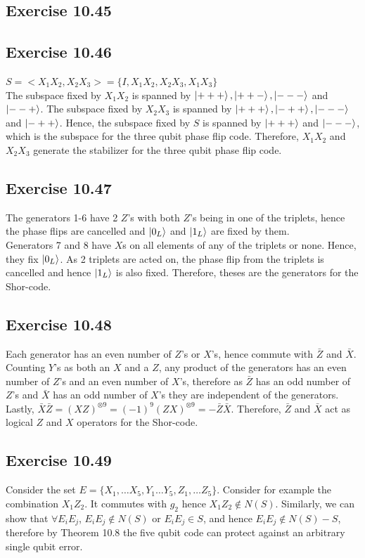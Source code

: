\documentclass[a4paper,12pt]{article}
\begin{document}
\subsection*{Exercise 10.45}

\subsection*{Exercise 10.46}
$S=<X_1X_2,X_2X_3>=\{I,X_1X_2,X_2X_3,X_1X_3\}$\\
The subspace fixed by $X_1X_2$ is spanned by $\ket{+++},\ket{++-},\ket{---}$ and $\ket{--+}$.
The subspace fixed by $X_2X_3$ is spanned by $\ket{+++},\ket{-++},\ket{---}$ and $\ket{-++}$.
Hence, the subspace fixed by $S$ is spanned by $\ket{+++}$ and $\ket{---}$, which is the subspace
for the three qubit phase flip code. Therefore, $X_1X_2$ and $X_2X_3$ generate the stabilizer
for the three qubit phase flip code. 
\subsection*{Exercise 10.47}
The generators 1-6 have 2 $Z$'s with both $Z$'s being in one of the triplets,
hence the phase flips are cancelled and $\ket{0_L}$ and $\ket{1_L}$ are fixed by them.\\
Generators 7 and 8 have $X$s on all elements of any of the triplets or none. Hence, they fix
$\ket{0_L}$. As 2 triplets are acted on, the phase flip from the triplets is cancelled and 
hence $\ket{1_L}$ is also fixed. Therefore, theses are the generators for the Shor-code.
\subsection*{Exercise 10.48}
Each generator has an even number of $Z$'s or $X$'s, hence commute with $\bar{Z}$ and $\bar{X}$.
Counting $Y$'s as both an $X$ and a $Z$, any product of the generators has an even number of $Z$'s
and an even number of $X$'s, therefore as $\bar{Z}$ has an odd number of $Z$'s and
$\bar{X}$ has an odd number of $X$'s they are independent of the generators. Lastly,
$\bar{X}\bar{Z}=(XZ)^{\otimes 9}=(-1)^9(ZX)^{\otimes 9}=-\bar{Z}\bar{X}$. Therefore,
$\bar{Z}$ and $\bar{X}$ act as logical $Z$ and $X$ operators for the Shor-code.
\subsection*{Exercise 10.49}
Consider the set $E=\{X_1,\ldots X_5,Y_1\ldots Y_5, Z_1,\ldots Z_5\}$.
Consider for example the combination $X_1Z_2$. It commutes with $g_2$ hence $X_1Z_2\notin N(S)$.
Similarly, we can show that $\forall E_iE_j$, $E_iE_j\notin N(S)$ or $E_iE_j\in S$, and hence
$E_iE_j\notin N(S)-S$, therefore by Theorem 10.8 the five qubit code can protect against an
arbitrary single qubit error. 
\end{document}
